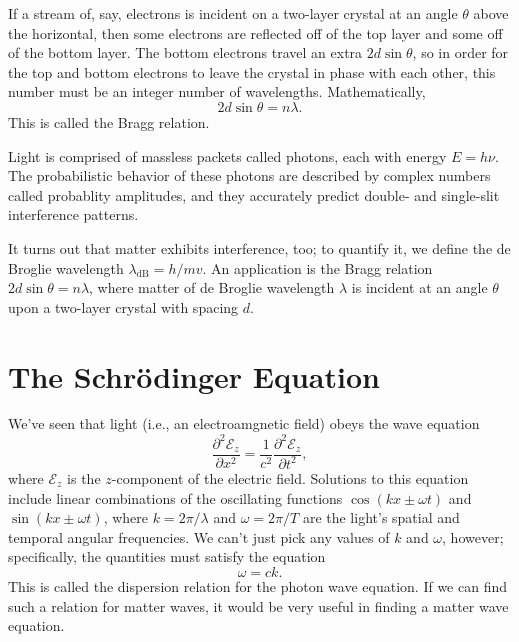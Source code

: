 \documentclass[../p052main.tex]{subfiles}
\begin{document}
If a stream of, say, electrons is incident on a two-layer crystal at an angle $\theta$ above the horizontal, then some electrons are reflected off of the top layer and some off of the bottom layer.
The bottom electrons travel an extra $2d\sin\theta$, so in order for the top and bottom electrons to leave the crystal in phase with each other, this number must be an integer number of wavelengths.
Mathematically,
\[ 2d \sin\theta = n \lambda. \]
This is called the Bragg relation.

\begin{summary}
    Light is comprised of massless packets called photons, each with energy $E = h\nu$.
    The probabilistic behavior of these photons are described by complex numbers called probablity amplitudes, and they accurately predict double- and single-slit interference patterns.

    It turns out that matter exhibits interference, too; to quantify it, we define the de Broglie wavelength $\lambda_\textrm{dB} = h / mv$.
    An application is the Bragg relation $2d \sin \theta = n \lambda$, where matter of de Broglie wavelength $\lambda$ is incident at an angle $\theta$ upon a two-layer crystal with spacing $d$.
\end{summary}

\section{The Schrödinger Equation}%
We've seen that light (i.e., an electroamgnetic field) obeys the wave equation
\[ \frac{\partial^2 \mathcal{E}_z}{\partial x^2} = \frac{1}{c^2} \frac{\partial^2 \mathcal{E}_z}{\partial t^2}, \]
where $\mathcal{E}_z$ is the $z$-component of the electric field.
Solutions to this equation include linear combinations of the oscillating functions $\cos (kx \pm \omega t)$ and $\sin (kx \pm \omega t)$, where $k = 2\pi / \lambda$ and $\omega = 2\pi / T$ are the light's spatial and temporal angular frequencies.
We can't just pick any values of $k$ and $\omega$, however; specifically, the quantities must satisfy the equation
\[ \omega = ck. \]
This is called the dispersion relation for the photon wave equation.
If we can find such a relation for matter waves, it would be very useful in finding a matter wave equation.
\end{document}
